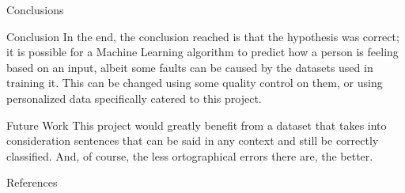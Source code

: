 \documentclass[11pt]{beamer}
\begin{document}
\begin{frame}{Conclusions}
	\begin{block}{Conclusion}
		In the end, the conclusion reached is that the hypothesis was correct; it is possible for a Machine Learning algorithm to predict how a person is feeling based on an input, albeit some faults can be caused by the datasets used in training it. This can be changed using some quality control on them, or using personalized data specifically catered to this project.
	\end{block}
	\begin{block}{Future Work}
		This project would greatly benefit from a dataset that takes into consideration sentences that can be said in any context and still be correctly classified. And, of course, the less ortographical errors there are, the better.
	\end{block}
\end{frame}


\begin{frame}{References}
	\centering
	\vspace*{-0.6cm}
	\setlength{\columnsep}{-0.2cm}
	\begin{multicols}{3}
		{\tiny }
	\end{multicols}
	
\end{frame}
\end{document}
